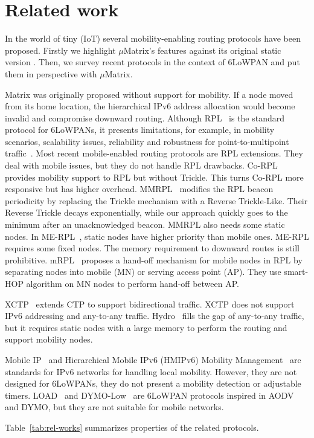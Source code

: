 \section{Related work}
\label{sec:related-work}

In the world of tiny (IoT) several mobility-enabling routing protocols have been proposed. Firstly we highlight $\mu$Matrix's features against its original static version \cite{Peres:2016}. Then, we survey recent protocols in the context of 6LoWPAN and put them in perspective with $\mu$Matrix. 
  
Matrix was originally proposed without support for mobility\cite{Peres:2016}. If a node moved from its home location, the hierarchical IPv6 address allocation would become invalid and compromise downward routing. Although RPL~\cite{rfc6550} is the standard protocol for 6LoWPANs, it presents limitations, for example, in mobility scenarios, scalability issues, reliability and robustness for point-to-multipoint traffic~\cite{iova2016rpl, Peres:2016}. Most recent mobile-enabled routing protocols are RPL extensions. They deal with mobile issues, but they do not handle RPL drawbacks. Co-RPL~\cite{gaddour2014co} provides mobility support to RPL but without Trickle. This turns Co-RPL more responsive but has higher overhead. MMRPL~\cite{cobarzan2014analysis} modifies the RPL beacon periodicity by replacing the Trickle mechanism with a Reverse Trickle-Like. Their Reverse Trickle decays exponentially, while our approach quickly goes to the minimum after an unacknowledged beacon. MMRPL also needs some static nodes. In ME-RPL~\cite{el2012mobility}, static nodes have higher priority than mobile ones. ME-RPL requires some fixed nodes. The memory requirement to downward routes is still prohibitive. mRPL~\cite{fotouhi2015mrpl} proposes a hand-off mechanism for mobile nodes in RPL by separating nodes into mobile (MN) or serving access point (AP). They use smart-HOP algorithm on MN nodes to perform hand-off between AP. 

XCTP~\cite{santos2015extend} extends CTP to support bidirectional traffic. XCTP does not support IPv6 addressing and any-to-any traffic. Hydro~\cite{dawson2010hydro} fills the gap of any-to-any traffic, but it requires static nodes with a large memory to perform the routing and support mobility nodes.

Mobile IP~\cite{perkins2011mobility} and Hierarchical Mobile IPv6 (HMIPv6) Mobility Management~\cite{rfc5380} are standards for IPv6 networks for handling local mobility. However, they are not designed for 6LoWPANs, they do not present a mobility detection or adjustable timers. LOAD~\cite{kim20076lowpan} and DYMO-Low~\cite{kim2007dynamic} are 6LoWPAN protocols inspired in AODV and DYMO, but they are not suitable for mobile networks.

Table~\ref{tab:rel-works} summarizes properties of the related protocols.

